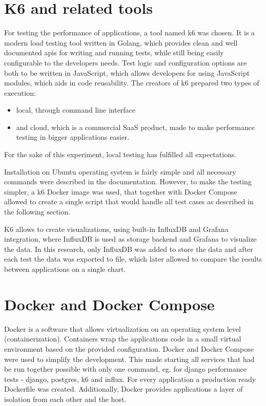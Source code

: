 \section{K6 and related tools}

For testing the performance of applications, a tool named k6 was chosen. It is a modern load testing tool written in Golang, which provides clean and well documented \acrshort{api}s for writing and running tests, while still being easily configurable to the developers needs. Test logic and configuration options are both to be written in JavaScript, which allows developers for using JavaScript modules, which aids in code reusability. The creators of k6 prepared two types of execution:
\begin{itemize}
    \item local, through command line interface
    \item and cloud, which is a commercial SaaS product, made to make performance testing in bigger applications easier.
\end{itemize}
For the sake of this experiment, local testing has fulfilled all expectations.

Installation on Ubuntu operating system is fairly simple and all necessary commands were described in the documentation. However, to make the testing simpler, a k6 Docker image was used, that together with Docker Compose allowed to create a single script that would handle all test cases as described in the following section.

K6 allows to create visualizations, using built-in InfluxDB and Grafana integration, where InfluxDB is used as storage backend and Grafana to visualize the data. In this research, only InfluxDB was added to store the data and after each test the data was exported to file, which later allowed to compare the results between applications on a single chart.

\section{Docker and Docker Compose}

Docker is a software that allows virtualization on an operating system level (containerization). Containers wrap the applications code in a small virtual environment based on the provided configuration. Docker and Docker Compose were used to simplify the development. This made starting all services that had be run together possible with only one command, eg. for django performance tests - django, postgres, k6 and influx. For every application a production ready Dockerfile was created. Additionally, Docker provides applications a layer of isolation from each other and the host.
